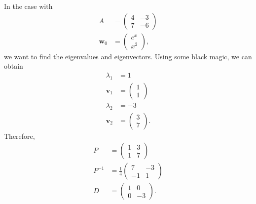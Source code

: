 \documentclass[10pt]{mypackage}
\begin{document}
\begin{example}
  In the case with
  \begin{align*}
    A &= \begin{pmatrix}4 & -3 \\ 7 & -6\end{pmatrix}\\
    \mathbf{w}_0 &= \begin{pmatrix}e^x\\x^2\end{pmatrix},
  \end{align*}
  we want to find the eigenvalues and eigenvectors. Using some black magic, we can obtain
  \begin{align*}
    \lambda_1 &= 1\\
    \mathbf{v}_1 &= \begin{pmatrix}1\\1\end{pmatrix}\\
    \lambda_2 &= -3\\
    \mathbf{v}_2 &= \begin{pmatrix}3\\7\end{pmatrix}.
  \end{align*}
  Therefore,
  \begin{align*}
    P &= \begin{pmatrix}1 & 3 \\ 1 & 7\end{pmatrix}\\
    P^{-1} &= \frac{1}{4} \begin{pmatrix}7 & -3 \\ -1 & 1\end{pmatrix}\\
    D &= \begin{pmatrix}1 & 0 \\ 0 & -3\end{pmatrix}.
  \end{align*}
  
\end{example}
\end{document}
